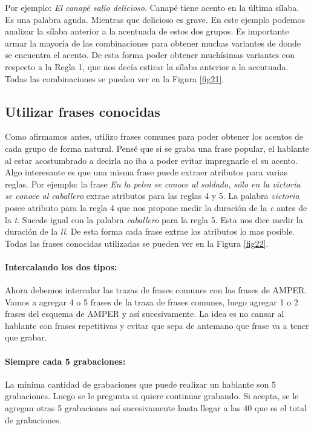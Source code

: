 \documentclass[11pt,a4paper,twoside]{tesis}
\begin{document}
Por ejemplo: \textit{El canapé salio delicioso}. Canapé tiene acento en la última sílaba. Es una palabra aguda. Mientras que delicioso es grave. En este ejemplo podemos analizar la sílaba anterior a la acentuada de estos dos grupos. Es importante armar la mayoría de las combinaciones para obtener muchas variantes de donde se encuentra el acento. De esta forma poder obtener muchísimas variantes con respecto a la Regla 1, que nos decía estirar la sílaba anterior a la acentuada. Todas las combinaciones se pueden ver en la Figura \ref{fig21}.


\subsection{Utilizar frases conocidas}

Como afirmamos antes, utilizo frases comunes para poder obtener los acentos de cada grupo de forma natural. Pensé que si se graba una frase popular, el hablante al estar acostumbrado a decirla no iba a poder evitar impregnarle el su acento. Algo interesante es que una misma frase puede extraer atributos para varias reglas. Por ejemplo: la frase \textit{En la pelea se conoce al soldado, sólo en la victoria se conoce al caballero} extrae atributos para las reglas 4 y 5. La palabra \textit{victoria} posee atributo para la regla 4 que nos propone medir la duración de la \textit{c} antes de la \textit{t}. Sucede igual con la palabra \textit{caballero} para la regla 5. Esta nos dice medir la duración de la \textit{ll}. De esta forma cada frase extrae los atributos lo mas posible. Todas las frases conocidas utilizadas se pueden ver en la Figura \ref{fig22}.

\paragraph{Intercalando los dos tipos:}

Ahora debemos intercalar las trazas de frases comunes con las frases de AMPER. Vamos a agregar 4 o 5 frases de la traza de frases comunes, luego agregar 1 o 2 frases del esquema de AMPER y así sucesivamente. La idea es no cansar al hablante con frases repetitivas y evitar que sepa de antemano que frase va a tener que grabar.

\paragraph{Siempre cada 5 grabaciones:}
La mínima cantidad de grabaciones que puede realizar un hablante son 5 grabaciones. Luego se le pregunta si quiere continuar grabando. Si acepta, se le agregan otras 5 grabaciones así sucesivamente hasta llegar a las 40 que es el total de grabaciones.
\end{document}
